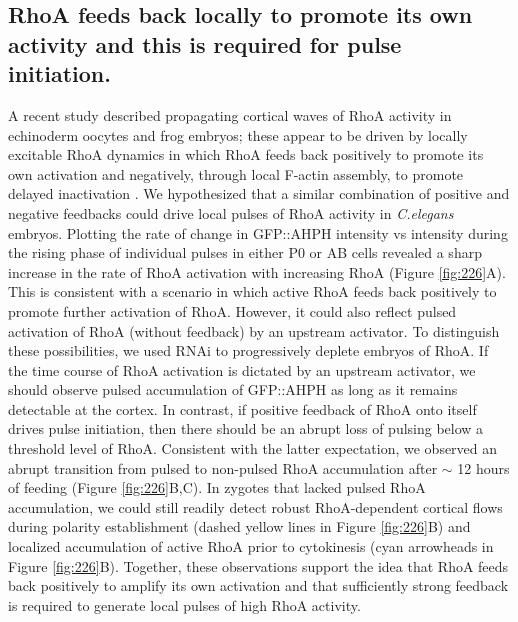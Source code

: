\subsection{RhoA feeds back locally to promote its own activity and this is required for pulse initiation.}
A recent study described propagating cortical waves of RhoA activity in echinoderm oocytes and frog embryos; these appear to be driven by locally excitable RhoA dynamics in which RhoA feeds back positively to promote its own activation and negatively, through local F-actin assembly, to promote delayed inactivation \cite{Bement:2015jp}.  We hypothesized that a similar combination of positive and negative feedbacks could drive local pulses of RhoA activity in \textit{C.elegans} embryos.  Plotting the rate of change in GFP::AHPH intensity vs intensity during the rising phase of individual pulses in either P0 or AB cells revealed a sharp increase in the rate of RhoA activation with increasing RhoA (Figure \ref{fig:226}A). This is consistent with a scenario in which active RhoA feeds back positively to promote further activation of RhoA.  However, it could also reflect pulsed activation of RhoA (without feedback) by an upstream activator.  To distinguish these possibilities, we used RNAi to progressively deplete embryos of RhoA. If the time course of RhoA activation is dictated by an upstream activator, we should observe pulsed accumulation of GFP::AHPH as long as it remains detectable at the cortex. In contrast, if positive feedback of RhoA onto itself drives pulse initiation, then there should be an abrupt loss of pulsing below a threshold level of RhoA.  Consistent with the latter expectation, we observed an abrupt transition from pulsed to non-pulsed RhoA accumulation after $\sim$ 12 hours of feeding (Figure \ref{fig:226}B,C).  In zygotes that lacked pulsed RhoA accumulation, we could still readily detect robust RhoA-dependent cortical flows \cite{Motegi:2006hi, Schonegg:2006ed} during polarity establishment (dashed yellow lines in Figure \ref{fig:226}B) and localized accumulation of active RhoA prior to cytokinesis (cyan arrowheads in Figure \ref{fig:226}B).  Together, these observations support the idea that RhoA feeds back positively to amplify its own activation and that sufficiently strong feedback is required to generate local pulses of high RhoA activity. 


